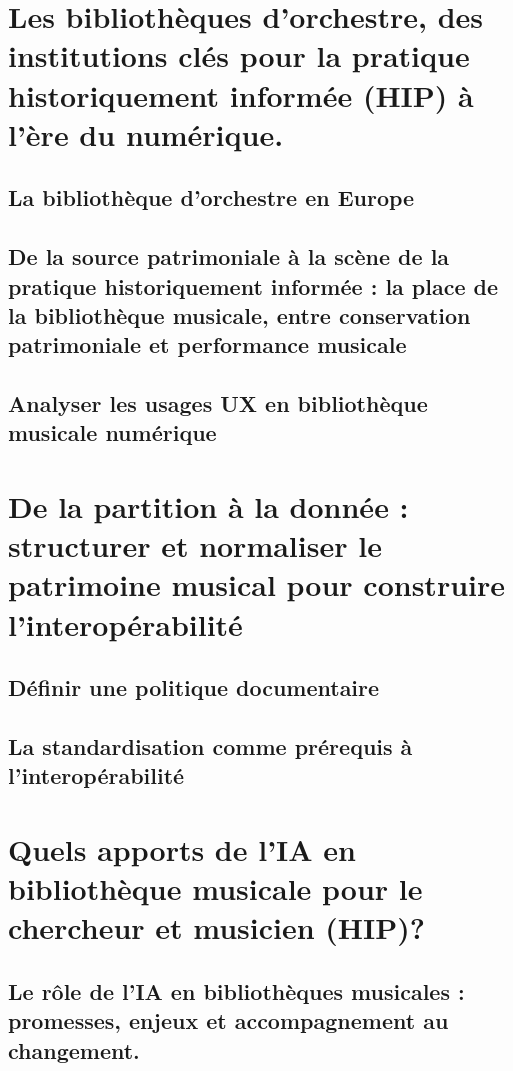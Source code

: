 \documentclass[12pt,twoside]{book}
\begin{document}
	
	
	\part{Les bibliothèques d’orchestre, des institutions clés pour la pratique historiquement informée (HIP) à l’ère du numérique.}
	\chapter{La bibliothèque d'orchestre en Europe}

	\chapter{De la source patrimoniale à la scène de la pratique historiquement informée : la place de la bibliothèque musicale, entre conservation patrimoniale et performance musicale}

	\chapter{Analyser les usages UX en bibliothèque musicale numérique}
	
	

	\part{De la partition à la donnée : structurer et normaliser le patrimoine musical pour construire l'interopérabilité}
	\chapter{Définir une politique documentaire}

	\chapter{La standardisation comme prérequis à l'interopérabilité}


	
	\part{Quels apports de l'IA en bibliothèque musicale pour le chercheur et musicien (HIP)?}
	
	\chapter{Le rôle de l'IA en bibliothèques musicales : promesses, enjeux et accompagnement au changement. }

\end{document}
